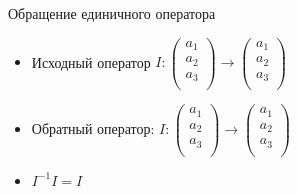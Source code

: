 \begin{frame}{Обращение единичного оператора}

\begin{itemize}[<+->]
    \item 
Исходный оператор $I : \begin{pmatrix}
  a_1 \\
  a_2 \\
  a_3 \\
\end{pmatrix} \to
\begin{pmatrix}
a_1 \\
a_2 \\
a_3 \\
\end{pmatrix}
$

\item \alert{Обратный оператор}:  
$I : \begin{pmatrix}
a_1 \\
a_2 \\
a_3 \\
    \end{pmatrix} \to
  \begin{pmatrix}
a_1 \\
a_2 \\
a_3 \\
    \end{pmatrix}
  $

\item $I^{-1} I = I$
\end{itemize}


\end{frame}
    





